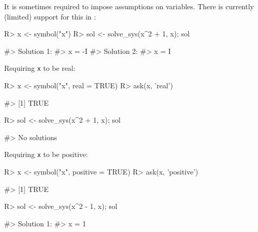 It is sometimes required to impose assumptions on variables. There is
currently (limited) support for this in :

\begin{Schunk}
\begin{Sinput}
R> x <- symbol("x")
R> sol <- solve_sys(x^2 + 1, x); sol
\end{Sinput}
\begin{Soutput}
#> Solution 1:
#>   x =  -I 
#> Solution 2:
#>   x =  I
\end{Soutput}
\end{Schunk}

Requiring \texttt{x} to be real:

\begin{Schunk}
\begin{Sinput}
R> x <- symbol("x", real = TRUE)
R> ask(x, 'real')
\end{Sinput}
\begin{Soutput}
#> [1] TRUE
\end{Soutput}
\begin{Sinput}
R> sol <- solve_sys(x^2 + 1, x); sol
\end{Sinput}
\begin{Soutput}
#> No solutions
\end{Soutput}
\end{Schunk}

Requiring \texttt{x} to be positive:

\begin{Schunk}
\begin{Sinput}
R> x <- symbol("x", positive = TRUE)
R> ask(x, 'positive')
\end{Sinput}
\begin{Soutput}
#> [1] TRUE
\end{Soutput}
\begin{Sinput}
R> sol <- solve_sys(x^2 - 1, x); sol
\end{Sinput}
\begin{Soutput}
#> Solution 1:
#>   x =  1
\end{Soutput}
\end{Schunk}


\address{%
Mikkel Meyer Andersen\\
Department of Mathematical Sciences, Aalborg University, Denmark\\%
Skjernvej 4A\\ 9220 Aalborg Ø, Denmark\\
%
%
%
\\\href{mailto:mikl@math.aau.dk}{\nolinkurl{mikl@math.aau.dk}}
}

\address{%
Søren Højsgaard\\
Department of Mathematical Sciences, Aalborg University, Denmark\\%
Skjernvej 4A\\ 9220 Aalborg Ø, Denmark\\
%
%
%
\\\href{mailto:sorenh@math.aau.dk}{\nolinkurl{sorenh@math.aau.dk}}
}

